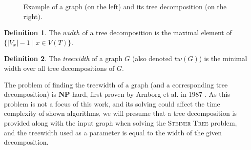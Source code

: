 \documentclass[thesis=M,english,hidelinks]{FITthesis}[2012/10/20]
\theoremstyle{definition}
\newtheorem{definition}{Definition}
\newcommand{\NPH}{\textbf{NP}-hard\xspace}
\begin{document}
\begin{figure}
    \centering
    \caption{Example of a graph (on the left) and its tree decomposition (on the right).}
    \label{fig:treedeco}
\end{figure}

\begin{definition}
    The $width$ of a tree decomposition is the maximal element of $\{ \lvert V_x \rvert - 1 \mid x \in V(T) \}$.
\end{definition}

\begin{definition}
    The \emph{treewidth} of a graph $G$ (also denoted $tw(G)$) is the minimal width over all tree decompositions of $G$.
\end{definition}

The problem of finding the treewidth of a graph (and a corresponding tree decomposition) is \NPH, first proven by
Arnborg et al. in 1987 \cite{Arnborg1987}. As this problem is not a focus of this work, and its solving could affect
the time complexity of shown algorithms, we will presume that a tree decomposition is provided along with
the input graph when solving the \textsc{Steiner Tree} problem, and the treewidth used as a parameter is equal to the
width of the given decomposition.
\end{document}

